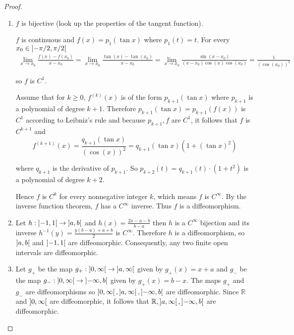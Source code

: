 \begin{proof}
    \begin{enumerate}[label={(\alph*)}]
        \item \( f \) is bijective (look up the properties of the tangent function).

              \( f \) is continuous and \( f(x) = p_{1}(\tan x) \) where \( p_{1}(t) = t \). For every \( x_{0} \in \left\rbrack{-\pi/2,\pi/2}\right\lbrack \)
              \begin{align*}
                  \lim\limits_{x\to x_{0}}\frac{f(x) - f(x_{0})}{x - x_{0}} = \lim\limits_{x\to x_{0}}\frac{\tan(x) - \tan(x_{0})}{x - x_{0}} = \lim\limits_{x\to x_{0}}\frac{\sin(x - x_{0})}{(x - x_{0})\cos(x)\cos(x_{0})} = \frac{1}{{(\cos(x_{0}))}^{2}}
              \end{align*}

              so \( f \) is \( C^{1} \).

              Assume that for \( k \ge 0 \), \( f^{(k)}(x) \) is of the form \( p_{k+1}(\tan x) \) where \( p_{k+1} \) is a polynomial of degree \( k+1 \). Therefore \( p_{k+1}(\tan x) = p_{k+1}(f(x)) \) is \( C^{1} \) according to Leibniz's rule and because \( p_{k+1}, f \) are \( C^{1} \), it follows that \( f \) is \( C^{k+1} \) and
              \[
                  f^{(k+1)}(x) = \frac{q_{k+1}(\tan x)}{{(\cos(x))}^{2}} = q_{k+1}(\tan x)(1 + {(\tan x)}^{2})
              \]

              where \( q_{k+1} \) is the derivative of \( p_{k+1} \). So \( p_{k+2}(t) = q_{k+1}(t)\cdot (1 + t^{2}) \) is a polynomial of degree \( k + 2 \).

              Hence \( f \) is \( C^{k} \) for every nonnegative integer \( k \), which means \( f \) is \( C^{\infty} \). By the inverse function theorem, \( f \) has a \( C^{\infty} \) inverse. Thus \( f \) is a diffeomorphism.
        \item Let \( h: \left\rbrack{-1, 1}\right\lbrack \to \left\rbrack{a, b}\right\lbrack \) and \( h(x) = \frac{2x - a - b}{b - a} \) then \( h \) is a \( C^{\infty} \) bijection and its inverse \( h^{-1}(y) = \frac{y(b - a) + a + b}{2} \) is \( C^{\infty} \). Therefore \( h \) is a diffeomorphism, so \( \left\rbrack{a, b}\right\lbrack \) and \( \left\rbrack{-1, 1}\right\lbrack \) are diffeomorphic. Consequently, any two finite open intervals are diffeomorphic.
        \item Let \( g_{+} \) be the map \( g_{+}: \left\rbrack{0, \infty}\right\lbrack \to \left\rbrack{a, \infty}\right\lbrack \) given by \( g_{+}(x) = x + a \) and \( g_{-} \) be the map \( g_{-}: \left\rbrack{0, \infty}\right\lbrack \to \left\rbrack{-\infty, b}\right\lbrack \) given by \( g_{+}(x) = b - x \). The maps \( g_{+} \) and \( g_{-} \) are diffeomorphisms so \( \left\rbrack{0, \infty}\right\lbrack, \left\rbrack{a, \infty}\right\lbrack, \left\rbrack{-\infty, b}\right\lbrack \) are diffeomorphic. Since \( \mathbb{R} \) and \( \left\rbrack{0, \infty}\right\lbrack \) are diffeomorphic, it follows that \( \mathbb{R}, \left\rbrack{a, \infty}\right\lbrack, \left\rbrack{-\infty, b}\right\lbrack \) are diffeomorphic.
    \end{enumerate}
\end{proof}

